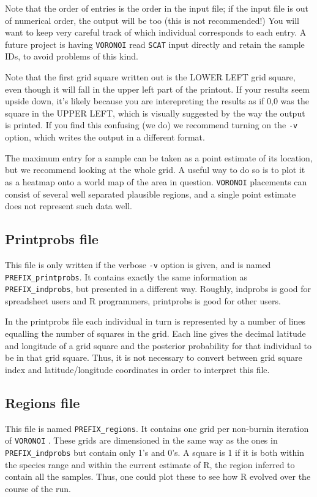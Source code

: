 \documentclass[10pt,titlepage,times,letterpaper]{article}
\def\SCAT{{\tt SCAT} }
\def\VORONOI{{\tt VORONOI} }
\begin{document}
Note that the order of entries is the order in the input file; if the input file is
out of numerical order, the output will be too (this is not recommended!)  You
will want to keep very careful track of which individual corresponds to each entry.
A future project is having \VORONOI read \SCAT input directly and retain the sample
IDs, to avoid problems of this kind.

Note that the first grid square written out is the LOWER LEFT grid square, even though
it will fall in the upper left part of the printout.  If your results seem upside
down, it's likely because you are interepreting the results as if 0,0 was the square
in the UPPER LEFT, which is visually suggested by the way the output is printed.
If you find this confusing (we do) we recommend turning on the {\tt -v} option,
which writes the output in a different format.

The maximum entry for a sample can be taken as a point estimate of its location, but
we recommend looking at the whole grid.  A useful way to do so is to plot it as a heatmap
onto a world map of the area in question.  \VORONOI placements can consist of several
well separated plausible regions, and a single point estimate does not represent
such data well.

\subsection{Printprobs file}

This file is only written if the verbose {\tt -v} option is given, and is named
{\tt PREFIX\_printprobs}.  It contains exactly the same information as 
{\tt PREFIX\_indprobs}, but presented in a different way.  Roughly, indprobs is good for
spreadsheet users and R programmers, printprobs is good for other users.

In the printprobs file each individual in turn is represented by a number of lines
equalling the number of squares in the grid.  Each line gives the decimal latitude and 
longitude of a grid square and the posterior probability for that individual to be
in that grid square.  Thus, it is not necessary to convert between grid square
index and latitude/longitude coordinates in order to interpret this file.

\subsection{Regions file}

This file is named {\tt PREFIX\_regions}.  It contains one grid per non-burnin
iteration of \VORONOI.  These grids are dimensioned in the same way as the ones in
{\tt PREFIX\_indprobs} but contain only 1's and 0's.  A square is 1 if it is both within
the species range and within the current estimate of R, the region inferred to contain all
the samples.  Thus, one could plot these to see how 
R evolved over the course of the run.
\end{document}
